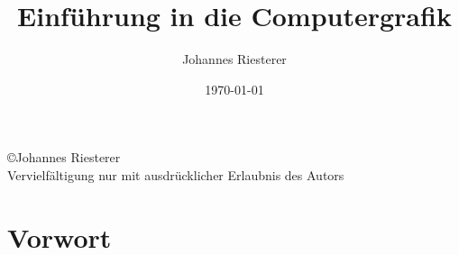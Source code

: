 \title{Einführung in die Computergrafik}
\author{Johannes Riesterer}
\date{\today}
\maketitle\thispagestyle{empty}
\newpage 
\begin{center}
\large
 \copyright Johannes Riesterer \\
Vervielfältigung nur mit ausdrücklicher Erlaubnis des Autors
\end{center}
\thispagestyle{empty}
\newpage

\section*{Vorwort}

\mbox{}\thispagestyle{empty}
\newpage
